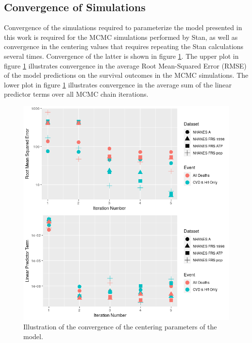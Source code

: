 \documentclass[
]{article}
\begin{document}
\hypertarget{convergence-of-simulations}{%
\subsection{Convergence of Simulations}\label{convergence-of-simulations}}

Convergence of the simulations required to parameterize the model presented in this work is required for the MCMC simulations performed by Stan, as well as convergence in the centering values that requires repeating the Stan calculations several times. Convergence of the latter is shown in figure \ref{fig:linpred_conv}. The upper plot in figure \ref{fig:linpred_conv} illustrates convergence in the average Root Mean-Squared Error (RMSE) of the model predictions on the survival outcomes in the MCMC simulations. The lower plot in figure \ref{fig:linpred_conv} illustrates convergence in the average sum of the linear predictor terms over all MCMC chain iterations.

\begin{figure}
\hypertarget{fig:linpred_conv}{%
\centering
\includegraphics{./Rmarkdown_Plots/RMSE-Linpred_Convergence.png}
\caption{Illustration of the convergence of the centering parameters of the model.}\label{fig:linpred_conv}
}
\end{figure}
\end{document}
